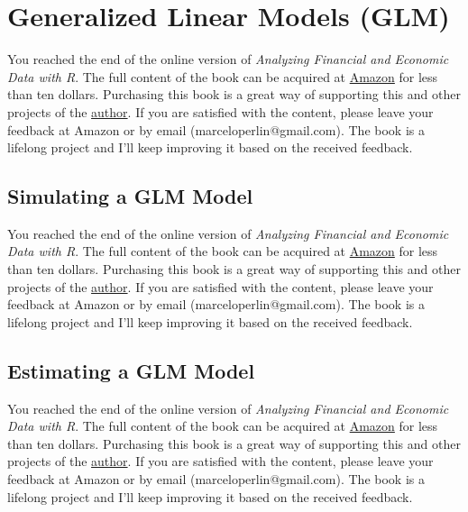 \documentclass[
  12pt,
]{book}
\newenvironment{pleasebuyit}
{\begin{noteblock}
		
	} {\end{noteblock}}
\begin{document}
\hypertarget{generalized-linear-models-glm}{%
\section{Generalized Linear Models (GLM)}\label{generalized-linear-models-glm}}

\begin{pleasebuyit}
You reached the end of the online version of \emph{Analyzing Financial
and Economic Data with R}. The full content of the book can be acquired
at \href{https://www.amazon.com/dp/B084LSNXMN}{Amazon} for less than ten
dollars. Purchasing this book is a great way of supporting this and
other projects of the \href{https://www.msperlin.com/}{author}. If you
are satisfied with the content, please leave your feedback at Amazon or
by email (marceloperlin@gmail.com). The book is a lifelong project and
I'll keep improving it based on the received feedback.
\end{pleasebuyit}

\hypertarget{simulating-a-glm-model}{%
\subsection{Simulating a GLM Model}\label{simulating-a-glm-model}}

\begin{pleasebuyit}
You reached the end of the online version of \emph{Analyzing Financial
and Economic Data with R}. The full content of the book can be acquired
at \href{https://www.amazon.com/dp/B084LSNXMN}{Amazon} for less than ten
dollars. Purchasing this book is a great way of supporting this and
other projects of the \href{https://www.msperlin.com/}{author}. If you
are satisfied with the content, please leave your feedback at Amazon or
by email (marceloperlin@gmail.com). The book is a lifelong project and
I'll keep improving it based on the received feedback.
\end{pleasebuyit}

\hypertarget{estimating-a-glm-model}{%
\subsection{Estimating a GLM Model}\label{estimating-a-glm-model}}

\begin{pleasebuyit}
You reached the end of the online version of \emph{Analyzing Financial
and Economic Data with R}. The full content of the book can be acquired
at \href{https://www.amazon.com/dp/B084LSNXMN}{Amazon} for less than ten
dollars. Purchasing this book is a great way of supporting this and
other projects of the \href{https://www.msperlin.com/}{author}. If you
are satisfied with the content, please leave your feedback at Amazon or
by email (marceloperlin@gmail.com). The book is a lifelong project and
I'll keep improving it based on the received feedback.
\end{pleasebuyit}
\end{document}
